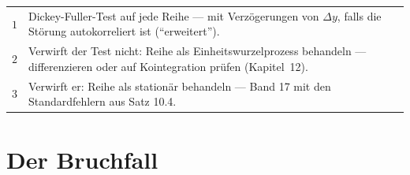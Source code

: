 \begin{merksatz}
\begin{center}
{\small
\renewcommand{\arraystretch}{1.55}
\begin{tabular}{@{}P{1.0cm}P{7.4cm}@{}}
\toprule
$1$ & Dickey-Fuller-Test auf jede Reihe --- mit Verzögerungen von $\Delta y$, falls die Störung autokorreliert ist (\enquote{erweitert}).\\
$2$ & Verwirft der Test nicht: Reihe als Einheitswurzelprozess behandeln --- differenzieren oder auf Kointegration prüfen (Kapitel~12).\\
$3$ & Verwirft er: Reihe als stationär behandeln --- Band 17 mit den Standardfehlern aus Satz 10.4.\\
\bottomrule
\end{tabular}}
\end{center}

\begin{center}
\begin{minipage}{0.88\textwidth}
\end{minipage}
\end{center}
\end{merksatz}

\section{Der Bruchfall}

